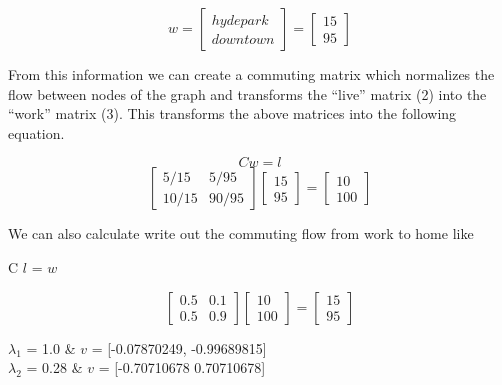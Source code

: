 \documentclass{article}
\begin{document}
\begin{equation}
      w
   =
  \begin{bmatrix}
    hyde park\\
    downtown
  \end{bmatrix} = 
  \begin{bmatrix}
    15\\
    95
  \end{bmatrix}
\end{equation}

From this information we can create a commuting matrix which normalizes the flow between nodes of the graph and transforms the “live” matrix (2) into the “work” matrix (3).  This transforms the above matrices into the following equation.

\begin{equation}C w = l\end{equation}
\begin{equation} 
  \begin{bmatrix}
    5/15 & 5/95\\
    10/15 & 90/95
  \end{bmatrix}
  \begin{bmatrix}
    15\\
    95
  \end{bmatrix}
  = 
  \begin{bmatrix}
    10\\
    100
  \end{bmatrix}
\end{equation}

We can also calculate write out the commuting flow from work to home like

\begin{center}C $l$ = $w$\end{center}
\begin{equation} 
  \begin{bmatrix}
    0.5 & 0.1\\
    0.5 & 0.9
  \end{bmatrix}
  \begin{bmatrix}
    10\\
    100
  \end{bmatrix}
  = 
  \begin{bmatrix}
    15\\
    95
  \end{bmatrix}
\end{equation}




$\lambda_{1}$ = 1.0 \& $v$ = [-0.07870249, -0.99689815]\\
$\lambda_{2}$ = 0.28 \& $v$ = [-0.70710678  0.70710678]
\end{document}
